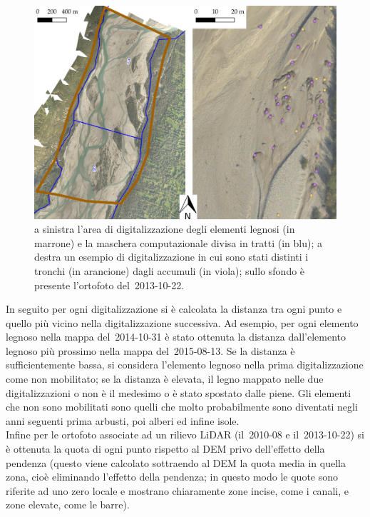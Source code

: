 \begin{figure}
	\centering
	\includegraphics[width = \textwidth]{files/digitalizzazione_legno.jpeg}
	\caption[area di digitalizzazione degli elementi legnosi]{a sinistra l'area di digitalizzazione degli elementi legnosi (in marrone) e la maschera computazionale divisa in tratti (in blu); a destra un esempio di digitalizzazione in cui sono stati distinti i tronchi (in arancione) dagli accumuli (in viola); sullo sfondo è presente l'ortofoto del~2013-10-22.}
	\label{fig:digitalizzazione-legno}
\end{figure}
%

In seguito per ogni digitalizzazione si è calcolata la distanza tra ogni punto e quello più vicino nella digitalizzazione successiva. Ad esempio, per ogni elemento legnoso nella mappa del~2014-10-31 è stato ottenuta la distanza dall'elemento legnoso più prossimo nella mappa del~2015-08-13.
Se la distanza è sufficientemente bassa, si considera l'elemento legnoso nella prima digitalizzazione come non mobilitato; se la distanza è elevata, il legno mappato nelle due digitalizzazioni o non è il medesimo o è stato spostato dalle piene.
Gli elementi che non sono mobilitati sono quelli che molto probabilmente sono diventati negli anni seguenti prima arbusti, poi alberi ed infine isole.
\\
Infine per le ortofoto associate ad un rilievo LiDAR (il~2010-08 e il~2013-10-22) si è ottenuta la quota di ogni punto rispetto al DEM privo dell'effetto della pendenza (questo viene calcolato sottraendo al DEM la quota media in quella zona, cioè eliminando l'effetto della pendenza; in questo modo le quote sono riferite ad uno zero locale e mostrano chiaramente zone incise, come i canali, e zone elevate, come le barre).
